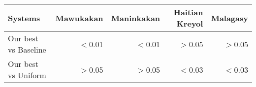 \begin{tabular}{lrrrr}
\toprule
Systems & Mawukakan & Maninkakan & Haitian Kreyol & Malagasy \\
\toprule
Our best vs Baseline & $<$0.01 & $<$0.01 & $>$0.05 & $>$0.05 \\
Our best vs Uniform & $>$0.05 & $>$0.05 & $<$0.03 & $<$0.03 \\
\bottomrule
\end{tabular}
